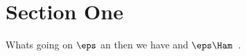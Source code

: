 \section{Section One}

Whats going on $\eps$ an then we have  and $\eps\Ham$~\cite{kerrisk2010linux}.